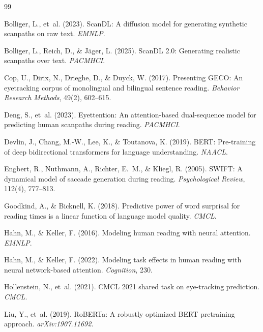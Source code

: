\documentclass[11pt]{article}
\begin{document}

\begin{thebibliography}{99}

Bolliger, L., et~al. (2023). ScanDL: A diffusion model for generating synthetic scanpaths on raw text. \emph{EMNLP}.

Bolliger, L., Reich, D., \& J\"ager, L. (2025). ScanDL 2.0: Generating realistic scanpaths over text. \emph{PACMHCI}.

Cop, U., Dirix, N., Drieghe, D., \& Duyck, W. (2017). Presenting GECO: An eyetracking corpus of monolingual and bilingual sentence reading. \emph{Behavior Research Methods}, 49(2), 602--615.

Deng, S., et~al. (2023). Eyettention: An attention-based dual-sequence model for predicting human scanpaths during reading. \emph{PACMHCI}.

Devlin, J., Chang, M.-W., Lee, K., \& Toutanova, K. (2019). BERT: Pre-training of deep bidirectional transformers for language understanding. \emph{NAACL}.

Engbert, R., Nuthmann, A., Richter, E.~M., \& Kliegl, R. (2005). SWIFT: A dynamical model of saccade generation during reading. \emph{Psychological Review}, 112(4), 777--813.

Goodkind, A., \& Bicknell, K. (2018). Predictive power of word surprisal for reading times is a linear function of language model quality. \emph{CMCL}.

Hahn, M., \& Keller, F. (2016). Modeling human reading with neural attention. \emph{EMNLP}.

Hahn, M., \& Keller, F. (2022). Modeling task effects in human reading with neural network-based attention. \emph{Cognition}, 230.

Hollenstein, N., et~al. (2021). CMCL 2021 shared task on eye-tracking prediction. \emph{CMCL}.

Liu, Y., et~al. (2019). RoBERTa: A robustly optimized BERT pretraining approach. \emph{arXiv:1907.11692}.


\end{thebibliography}
\end{document}
